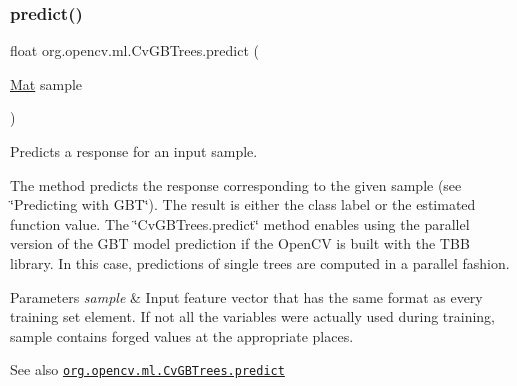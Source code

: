 \subsubsection{\texorpdfstring{predict()}{predict()}\hspace{0.1cm}{\footnotesize\ttfamily [2/2]}}
{\footnotesize\ttfamily float org.\+opencv.\+ml.\+Cv\+G\+B\+Trees.\+predict (\begin{DoxyParamCaption}\item[{\mbox{\hyperlink{classorg_1_1opencv_1_1core_1_1_mat}{Mat}}}]{sample }\end{DoxyParamCaption})}

Predicts a response for an input sample.

The method predicts the response corresponding to the given sample (see \char`\"{}\+Predicting with G\+B\+T\char`\"{}). The result is either the class label or the estimated function value. The \char`\"{}\+Cv\+G\+B\+Trees.\+predict\char`\"{} method enables using the parallel version of the G\+BT model prediction if the Open\+CV is built with the T\+BB library. In this case, predictions of single trees are computed in a parallel fashion.


\begin{DoxyParams}{Parameters}
{\em sample} & Input feature vector that has the same format as every training set element. If not all the variables were actually used during training, {\ttfamily sample} contains forged values at the appropriate places.\\
\hline
\end{DoxyParams}
\begin{DoxySeeAlso}{See also}
\href{http://docs.opencv.org/modules/ml/doc/gradient_boosted_trees.html#cvgbtrees-predict}{\tt org.\+opencv.\+ml.\+Cv\+G\+B\+Trees.\+predict} 
\end{DoxySeeAlso}
\mbox{\label{classorg_1_1opencv_1_1ml_1_1_cv_g_b_trees_a248cd65534718871f62730e8c8ac142a}} 
